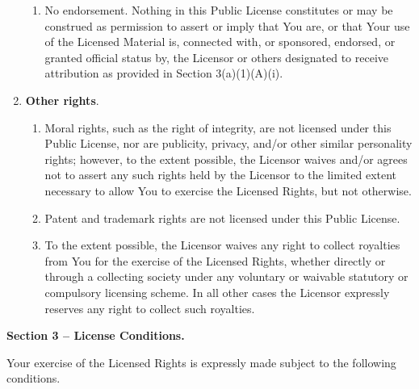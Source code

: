 \begin{enumerate}
\begin{enumerate}
\item No endorsement. Nothing in this Public License constitutes or may be construed as permission to assert or imply that You are, or that Your use of the Licensed Material is, connected with, or sponsored, endorsed, or granted official status by, the Licensor or others designated to receive attribution as provided in Section 3(a)(1)(A)(i).
\end{enumerate}
\item \par \textbf{Other rights}.
\begin{enumerate}
\item Moral rights, such as the right of integrity, are not licensed under this Public License, nor are publicity, privacy, and/or other similar personality rights; however, to the extent possible, the Licensor waives and/or agrees not to assert any such rights held by the Licensor to the limited extent necessary to allow You to exercise the Licensed Rights, but not otherwise.
\item Patent and trademark rights are not licensed under this Public License.
\item To the extent possible, the Licensor waives any right to collect royalties from You for the exercise of the Licensed Rights, whether directly or through a collecting society under any voluntary or waivable statutory or compulsory licensing scheme. In all other cases the Licensor expressly reserves any right to collect such royalties.
\end{enumerate}

\end{enumerate}
\par \textbf{Section 3 – License Conditions.}
\par Your exercise of the Licensed Rights is expressly made subject to the following conditions.
